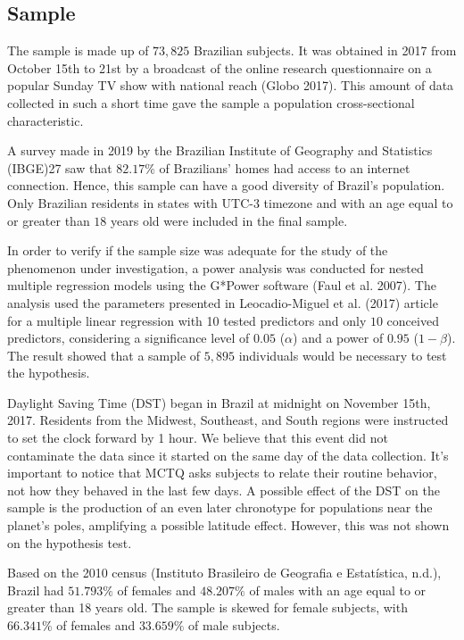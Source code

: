 \documentclass[
  12pt,
  a4paper,
  oneside]{tesesusp}
\begin{document}
\hypertarget{sample}{%
\subsection{Sample}\label{sample}}

The sample is made up of \(73,825\) Brazilian subjects. It was obtained
in 2017 from October 15th to 21st by a broadcast of the online research
questionnaire on a popular Sunday TV show with national reach (Globo
2017). This amount of data collected in such a short time gave the
sample a population cross-sectional characteristic.

A survey made in 2019 by the Brazilian Institute of Geography and
Statistics (IBGE)27 saw that \(82.17\%\) of Brazilians' homes had access
to an internet connection. Hence, this sample can have a good diversity
of Brazil's population. Only Brazilian residents in states with UTC-3
timezone and with an age equal to or greater than \(18\) years old were
included in the final sample.

In order to verify if the sample size was adequate for the study of the
phenomenon under investigation, a power analysis was conducted for
nested multiple regression models using the G*Power software (Faul et
al. 2007). The analysis used the parameters presented in Leocadio-Miguel
et al. (2017) article for a multiple linear regression with 10 tested
predictors and only \(10\) conceived predictors, considering a
significance level of \(0.05\) (\(\alpha\)) and a power of \(0.95\)
(\(1 - \beta\)). The result showed that a sample of \(5,895\)
individuals would be necessary to test the hypothesis.

Daylight Saving Time (DST) began in Brazil at midnight on November 15th,
2017. Residents from the Midwest, Southeast, and South regions were
instructed to set the clock forward by 1 hour. We believe that this
event did not contaminate the data since it started on the same day of
the data collection. It's important to notice that MCTQ asks subjects to
relate their routine behavior, not how they behaved in the last few
days. A possible effect of the DST on the sample is the production of an
even later chronotype for populations near the planet's poles,
amplifying a possible latitude effect. However, this was not shown on
the hypothesis test.

Based on the 2010 census (Instituto Brasileiro de Geografia e
Estatística, n.d.), Brazil had \(51.793\%\) of females and \(48.207\%\)
of males with an age equal to or greater than 18 years old. The sample
is skewed for female subjects, with \(66.341\%\) of females and
\(33.659\%\) of male subjects.
\end{document}
